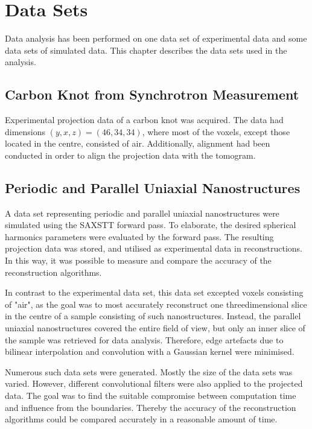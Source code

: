 \chapter{Data Sets} %
\label{sec:reconstruction_data_sets}

Data analysis has been performed on one data set of experimental data and some data sets of simulated data.
This chapter describes the data sets used in the analysis.

\section{Carbon Knot from Synchrotron Measurement} %
Experimental projection data of a carbon knot was acquired.
The data had dimensions $(y,x,z) = (46,34,34)$, where most of the voxels, except those located in the centre, consisted of air.  %
Additionally, alignment had been conducted in order to align the projection data with the tomogram.


\section{Periodic and Parallel Uniaxial Nanostructures} %
A data set representing periodic and parallel uniaxial nanostructures were simulated using the SAXSTT forward pass.
To elaborate, the desired spherical harmonics parameters were evaluated by the forward pass.
The resulting projection data was stored, and utilised as experimental data in reconstructions.
In this way, it was possible to measure and compare the accuracy of the reconstruction algorithms.

In contrast to the experimental data set, this data set excepted voxels consisting of "air",
as the goal was to most accurately reconstruct one threedimensional slice in the centre of a sample consisting of such nanostructures.
Instead, the parallel uniaxial nanostructures covered the entire field of view, but only an inner slice of the sample was retrieved for data analysis.
Therefore, edge artefacts due to bilinear interpolation and convolution with a Gaussian kernel were minimised.

Numerous such data sets were generated. Mostly the size of the data sets was varied. However, different convolutional filters were also applied to the projected data.
The goal was to find the suitable compromise between computation time and influence from the boundaries.
Thereby the accuracy of the reconstruction algorithms could be compared accurately in a reasonable amount of time.

